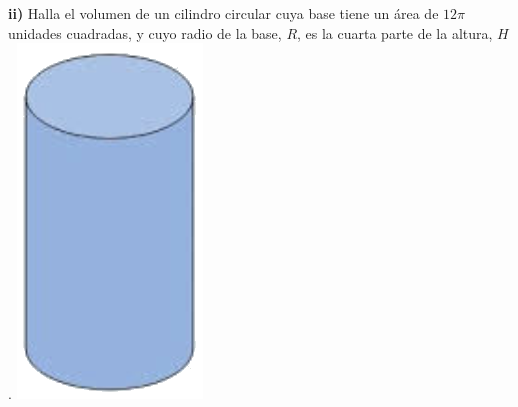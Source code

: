 \documentclass[12pt,a4paper]{article}
\begin{document}
\begin{tcolorbox}[enhanced, breakable,
	colback=fondoverde, colframe=verdeclaro, title=\textbf{PRACTICA}]
	\begin{tcolorbox}[enhanced, frame hidden, boxrule=0pt, colback=fondoverde,
		sidebyside, sidebyside align=top seam, righthand width=0.09\textwidth,
		sidebyside gap=8pt]
		\textbf{ii)} Halla el volumen de un cilindro circular cuya base tiene un área de $12\pi$ unidades cuadradas, y cuyo radio de la base, $R$, es la cuarta parte de la altura, $H$.
		\tcblower
		\includegraphics[width=\linewidth]{Figuras/fig5.png}
	\end{tcolorbox}
	

\end{tcolorbox}
\end{document}
